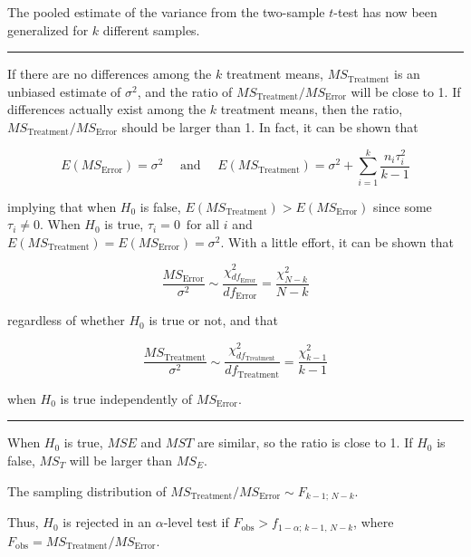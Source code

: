 \documentclass[
]{article}
\begin{document}
The pooled estimate of the variance from the two-sample \(t\)-test has now been generalized for \(k\) different samples.

\begin{center}\rule{0.5\linewidth}{0.5pt}\end{center}

If there are no differences among the \(k\) treatment means, \(MS_\text{Treatment}\) is an unbiased estimate of \(\sigma^2\), and the ratio of \(MS_\text{Treatment}/MS_\text{Error}\) will be close to 1. If differences actually exist among the \(k\) treatment means, then the ratio, \(MS_\text{Treatment}/MS_\text{Error}\) should be larger than 1. In fact, it can be shown that

\begin{equation*}
E(MS_\text{Error}) = \sigma^2 \quad \text{ and }\quad E(MS_\text{Treatment})
= \sigma^2 + \sum_{i=1}^{k} \frac{n_i \tau_i^2}{k-1}
\end{equation*}

implying that when \(H_0\) is false, \(E(MS_\text{Treatment}) > E(MS_\text{Error})\) since some \(\tau_i\ne 0\). When \(H_0\) is true, \(\tau_i = 0 \, \text{ for all } i\) and \(E(MS_\text{Treatment}) = E(MS_\text{Error}) =\sigma^2\). With a little effort, it can be shown that

\begin{equation*}
\frac{MS_\text{Error}}{\sigma^2} \sim
\frac{\chi^2_{df_\text{Error}}}{df_\text{Error}} = \frac{\chi^2_{N-k}}{N-k}
\end{equation*}

regardless of whether \(H_0\) is true or not, and that

\begin{equation*}
\frac{MS_\text{Treatment}}{\sigma^2} \sim
\frac{\chi^2_{df_\text{Treatment}}}{df_\text{Treatment}} =
\frac{\chi^2_{k-1}}{k-1}
\end{equation*}

when \(H_0\) is true independently of \(MS_\text{Error}\).

\begin{center}\rule{0.5\linewidth}{0.5pt}\end{center}

When \(H_0\) is true, \(MSE\) and \(MST\) are similar, so the ratio is close to 1. If \(H_0\) is false, \(MS_T\) will be larger than \(MS_E\).

The sampling distribution of \(MS_\text{Treatment}/MS_\text{Error} \sim F_{k-1;\, N-k}\).

Thus, \(H_0\) is
rejected in an \(\alpha\)-level test if \(F_\text{obs} > f_{1-\alpha;\, k-1,\, N-k }\), where \(F_\text{obs} = MS_\text{Treatment}/MS_\text{Error}\).
\end{document}
